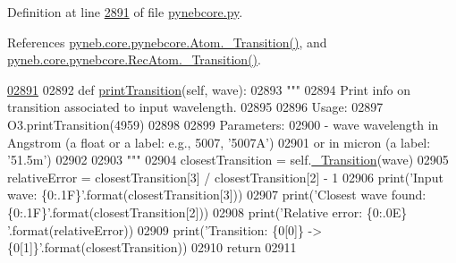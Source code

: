 Definition at line \hyperlink{pynebcore_8py_source_l02891}{2891} of file \hyperlink{pynebcore_8py_source}{pynebcore.\-py}.



References \hyperlink{pynebcore_8py_source_l01433}{pyneb.\-core.\-pynebcore.\-Atom.\-\_\-\-Transition()}, and \hyperlink{pynebcore_8py_source_l02812}{pyneb.\-core.\-pynebcore.\-Rec\-Atom.\-\_\-\-Transition()}.


\begin{DoxyCode}
\hypertarget{classpyneb_1_1core_1_1pynebcore_1_1_rec_atom_l02891}{}\hyperlink{classpyneb_1_1core_1_1pynebcore_1_1_rec_atom_aea8927d7a4c6e507ad7239760e5b41c8}{02891} 
02892     \textcolor{keyword}{def }\hyperlink{classpyneb_1_1core_1_1pynebcore_1_1_rec_atom_aea8927d7a4c6e507ad7239760e5b41c8}{printTransition}(self, wave):
02893         \textcolor{stringliteral}{"""}
02894 \textcolor{stringliteral}{        Print info on transition associated to input wavelength.}
02895 \textcolor{stringliteral}{        }
02896 \textcolor{stringliteral}{        Usage:}
02897 \textcolor{stringliteral}{            O3.printTransition(4959)}
02898 \textcolor{stringliteral}{            }
02899 \textcolor{stringliteral}{        Parameters:}
02900 \textcolor{stringliteral}{            - wave      wavelength in Angstrom (a float or a label: e.g., 5007, '5007A') }
02901 \textcolor{stringliteral}{                or in micron (a label: '51.5m')}
02902 \textcolor{stringliteral}{                }
02903 \textcolor{stringliteral}{        """}
02904         closestTransition = self.\hyperlink{classpyneb_1_1core_1_1pynebcore_1_1_rec_atom_a32b31a371f3b6ecc5bbbc4d0c5d2a855}{\_Transition}(wave)
02905         relativeError = closestTransition[3] / closestTransition[2] - 1
02906         print(\textcolor{stringliteral}{'Input wave: \{0:.1F\}'}.format(closestTransition[3]))
02907         print(\textcolor{stringliteral}{'Closest wave found: \{0:.1F\}'}.format(closestTransition[2]))
02908         print(\textcolor{stringliteral}{'Relative error: \{0:.0E\} '}.format(relativeError))
02909         print(\textcolor{stringliteral}{'Transition: \{0[0]\} -> \{0[1]\}'}.format(closestTransition))
02910         \textcolor{keywordflow}{return}
02911     
              
\end{DoxyCode}


